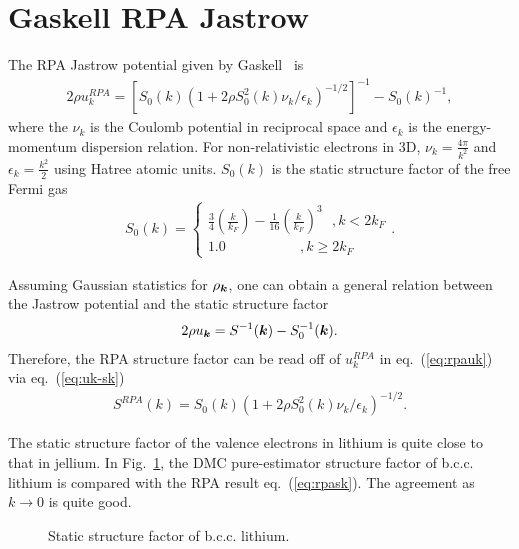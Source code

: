\section{Gaskell RPA Jastrow}
\label{sec:gaskell-rpa-jas}
The RPA Jastrow potential given by Gaskell~\cite{Gaskell1961, Ceperley1978, Holzmann2009, Holzmann2016} is
\begin{align}
2\rho u^{RPA}_k = \left[ S_0(k) \left( 1 + 2\rho S_0^2(k) \nu_k/\epsilon_k \right)^{-1/2} \right] ^{-1} - S_0(k)^{-1}, \label{eq:rpauk}
\end{align}
where the $\nu_k$ is the Coulomb potential in reciprocal space and $\epsilon_k$ is the energy-momentum dispersion relation. For non-relativistic electrons in 3D, $\nu_k=\frac{4\pi}{k^2}$ and $\epsilon_k=\frac{k^2}{2}$ using Hatree atomic units. $S_0(k)$ is the static structure factor of the free Fermi gas
\begin{align}
S_0(k) = \left\{\begin{array}{l}
\frac{3}{4}\left( \frac{k}{k_F} \right) - \frac{1}{16}\left(\frac{k}{k_F}\right)^3 ~~~, k<2k_F \\
1.0 ~~~~~~~~~~~~~~~~~~~~~~~~, k \geq 2k_F
\end{array}\right..
\end{align}

Assuming Gaussian statistics for $\rho_{\boldsymbol{k}}$, one can obtain a general relation between the Jastrow potential and the static structure factor~\cite{Holzmann2011} %
\begin{align}
2\rho u_{\boldsymbol{k}} = S^{-1}(\boldsymbol{k}) - S^{-1}_0(\boldsymbol{k}). \label{eq:uk-sk}
\end{align}
Therefore, the RPA structure factor can be read off of $u^{RPA}_k$ in eq.~(\ref{eq:rpauk}) via eq.~(\ref{eq:uk-sk})
\begin{align}
S^{RPA}(k) = S_0(k)\left( 1 + 2\rho S_0^2(k) \nu_k/\epsilon_k \right)^{-1/2}. \label{eq:rpask}
\end{align}

The static structure factor of the valence electrons in lithium is quite close to that in jellium. In Fig.~\ref{fig:rpask}, the DMC pure-estimator structure factor of b.c.c. lithium is compared with the RPA result eq.~(\ref{eq:rpask}). The agreement as $k\rightarrow0$ is quite good.

\begin{figure}[h]
\caption{Static structure factor of b.c.c. lithium.\label{fig:rpask}}
\end{figure}

